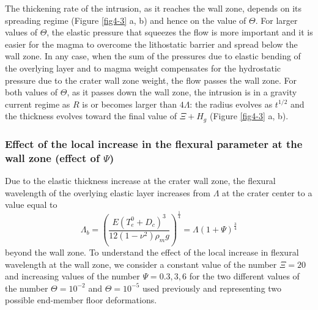 \begin{article}
	The thickening rate  of the intrusion, as it  reaches the wall
        zone, depends on its  spreading regime (Figure \ref{fig4-3} a,
        b) and  hence on the value  of $\Theta$. For larger  values of
        $\Theta$, the elastic pressure that  squeezes the flow is more
        important  and it  is easier  for  the magma  to overcome  the
        lithostatic barrier  and spread  below the  wall zone.  In any
        case, when the sum of the  pressures due to elastic bending of
        the overlying  layer and to  magma weight compensates  for the
        hydrostatic pressure due  to the crater wall  zone weight, the
        flow passes the wall zone. For  both values of $\Theta$, as it
        passes  down the  wall zone,  the  intrusion is  in a  gravity
        current regime  as $R$ is  or becomes larger  than $4\Lambda$:
        the  radius evolves  as  $t^{1/2}$ and  the thickness  evolves
        toward the final value of  $\Xi + H_g$ (Figure \ref{fig4-3} a,
        b).
	
        \subsubsection{Effect of  the local  increase in  the flexural
          parameter at the wall zone (effect of $\Psi$)}
		
        Due to the elastic thickness increase at the crater wall zone,
        the  flexural  wavelength  of   the  overlying  elastic  layer
        increases from $\Lambda$ at the crater center to a value equal
        to
        \begin{equation}
          \Lambda_{b}=\left( \frac{E(T_{e}^0+D_c)^3}{12(1-\nu^2)\rho_m g}\right)^{\frac{1}{4}} = \Lambda (1+\Psi)^{\frac{3}{4}}
        \end{equation}
        beyond the  wall zone. To  understand the effect of  the local
        increase in flexural wavelength at  the wall zone, we consider
        a constant value of the  number $\Xi=20$ and increasing values
        of the number  $\Psi=0.3,3,6$ for the two  different values of
        the   number   $\Theta=10^{-2}$  and   $\Theta=10^{-5}$   used
        previously  and  representing  two possible  end-member  floor
        deformations.
		

\end{article}
